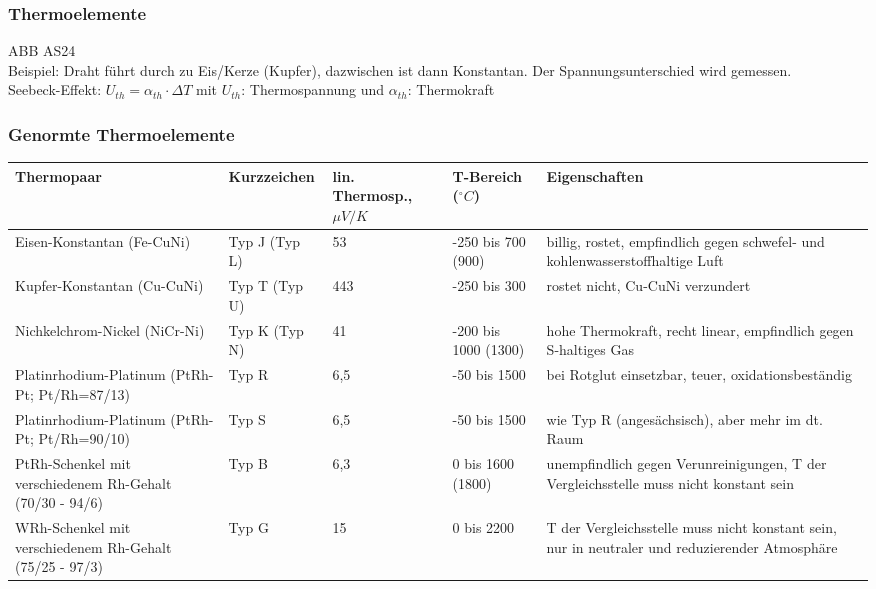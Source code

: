 \subsubsection{Thermoelemente}
ABB AS24\\
Beispiel: Draht führt durch zu Eis/Kerze (Kupfer), dazwischen ist dann Konstantan. Der Spannungsunterschied wird gemessen.\\
Seebeck-Effekt: $U_{th}=\alpha_{th} \cdot \Delta T$ mit $U_{th}$: Thermospannung und $\alpha_{th}$: Thermokraft

\subsubsection{Genormte Thermoelemente}
\begin{tabular}{L{0.2} | l L{0.1} | l | L{0.3}}
Thermopaar & Kurzzeichen & lin. Thermosp., $\mu V/K$ & T-Bereich ($^\circ C$) & Eigenschaften\\ \hline 
Eisen-Konstantan (Fe-CuNi) & Typ J (Typ L) & 53 & -250 bis 700 (900) & billig, rostet, empfindlich gegen schwefel- und kohlenwasserstoffhaltige Luft\\\hline
Kupfer-Konstantan (Cu-CuNi) & Typ T (Typ U) & 443 & -250 bis 300 & rostet nicht, Cu-CuNi verzundert\\\hline
Nichkelchrom-Nickel (NiCr-Ni) & Typ K (Typ N) & 41 & -200 bis 1000 (1300) & hohe Thermokraft, recht linear, empfindlich gegen S-haltiges Gas\\\hline
Platinrhodium-Platinum (PtRh-Pt; Pt/Rh=87/13) & Typ R & 6,5 & -50 bis 1500 & bei Rotglut einsetzbar, teuer, oxidationsbeständig\\\hline
Platinrhodium-Platinum (PtRh-Pt; Pt/Rh=90/10) & Typ S & 6,5 & -50 bis 1500 & wie Typ R (angesächsisch), aber mehr im dt. Raum\\\hline
PtRh-Schenkel mit verschiedenem Rh-Gehalt (70/30 - 94/6) & Typ B & 6,3 & 0 bis 1600 (1800) & unempfindlich gegen Verunreinigungen, T der Vergleichsstelle muss nicht konstant sein\\\hline
WRh-Schenkel mit verschiedenem Rh-Gehalt (75/25 - 97/3) & Typ G & 15 & 0 bis 2200 & T der Vergleichsstelle muss nicht konstant sein, nur in neutraler und reduzierender Atmosphäre
\end{tabular}


